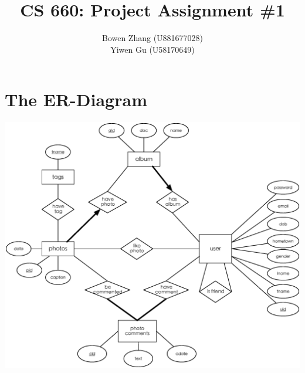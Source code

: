 \documentclass[11pt, oneside]{article}   	%
\title{CS 660: Project Assignment \#1}
\author{Bowen Zhang (U881677028) \\Yiwen Gu (U58170649)}
\date{}							%
\begin{document}
\maketitle
\section{The ER-Diagram}				
\includegraphics[width=6in]{pa1.eps} 
\end{document}
